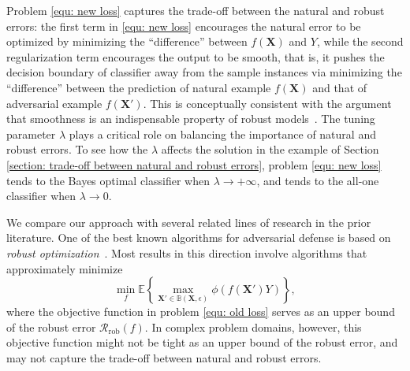 \documentclass[11pt]{article}
\newcommand{\adv}{\mathrm{rob}}
\newcommand{\X}{\bm{X}}
\newcommand{\0}{\mathbf{0}}
\newcommand{\1}{\mathbf{1}}
\newcommand{\cR}{\mathcal{R}}
\newcommand{\bbB}{\mathbb{B}}
\newcommand{\bbE}{\mathbb{E}}
\begin{document}
\medskip
{}
Problem \eqref{equ: new loss}  captures the trade-off between the natural and robust errors: the first term in \eqref{equ: new loss} encourages the natural error to be optimized by minimizing the ``difference'' between $f(\X)$ and $Y$, while the second regularization term encourages the output to be smooth, that is, it pushes the decision boundary of classifier away from the sample instances via minimizing the ``difference'' between the prediction of natural example $f(\X)$ and that of adversarial example $f(\X')$. This is conceptually consistent with the argument that smoothness is an indispensable property of robust models~\cite{cisse2017parseval}. The tuning parameter $\lambda$ plays a critical role on balancing the importance of natural and robust errors. To see how the $\lambda$ affects the solution in the example of Section \ref{section: trade-off between natural and robust errors}, problem \eqref{equ: new loss} tends to the Bayes optimal classifier when $\lambda\rightarrow +\infty$, and tends to the all-one classifier when $\lambda\rightarrow 0$.



\medskip
{}
We compare our approach with several related lines of research in the prior literature.  One of the best known algorithms for adversarial defense is based on  \emph{robust optimization}~\cite{madry2018towards,kolter2017provable,wong1805scaling,raghunathan2018certified,raghunathan2018semidefinite}. Most results in this direction involve algorithms that approximately minimize
\begin{equation}
\label{equ: old loss}
\min_{f} \bbE \left\{ \max_{\X'\in\bbB(\X,\epsilon)}\phi(f(\X')Y)\right\},
\end{equation}
where the objective function in problem \eqref{equ: old loss} serves as an upper bound of the robust error $\cR_\adv(f)$. In complex problem domains, however, this objective function might not be tight as an upper bound of the robust error, and may not capture the trade-off between natural and robust errors. 
\end{document}
